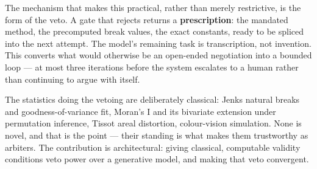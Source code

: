 The mechanism that makes this practical, rather than merely restrictive, is the form of the veto. A gate that rejects returns a \textbf{prescription}: the mandated method, the precomputed break values, the exact constants, ready to be spliced into the next attempt. The model's remaining task is transcription, not invention. This converts what would otherwise be an open-ended negotiation into a bounded loop --- at most three iterations before the system escalates to a human rather than continuing to argue with itself.

The statistics doing the vetoing are deliberately classical: Jenks natural breaks and goodness-of-variance fit, Moran's I and its bivariate extension under permutation inference, Tissot areal distortion, colour-vision simulation. None is novel, and that is the point --- their standing is what makes them trustworthy as arbiters. The contribution is architectural: giving classical, computable validity conditions veto power over a generative model, and making that veto convergent.

